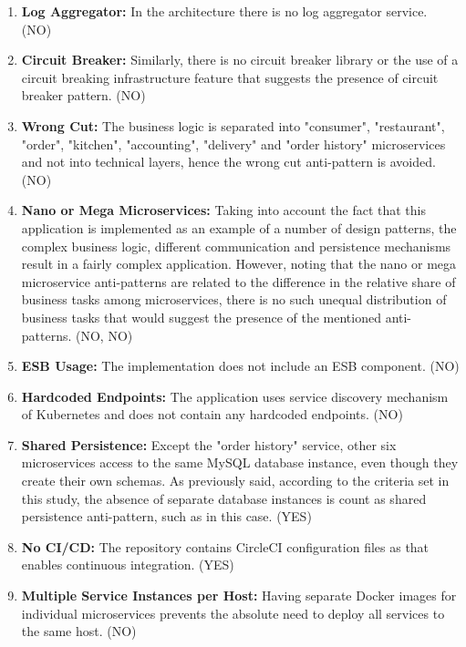 \documentclass{Configuration_Files/PoliMi3i_thesis}
\begin{document}
\begin{enumerate}
    \item \textbf{Log Aggregator:} In the architecture there is no log aggregator service. (NO)
    
    \item \textbf{Circuit Breaker:} Similarly, there is no circuit breaker library or the use of a circuit breaking infrastructure feature that suggests the presence of circuit breaker pattern. (NO)
    
    \item \textbf{Wrong Cut:} The business logic is separated into "consumer", "restaurant", "order", "kitchen", "accounting", "delivery" and "order history" microservices and not into technical layers, hence the wrong cut anti-pattern is avoided. (NO)
    
    \item \textbf{Nano or Mega Microservices:} Taking into account the fact that this application is implemented as an example of a number of design patterns, the complex business logic, different communication and persistence mechanisms result in a fairly complex application.
    However, noting that the nano or mega microservice anti-patterns are related to the difference in the relative share of business tasks among microservices, there is no such unequal distribution of business tasks that would suggest the presence of the mentioned anti-patterns. (NO, NO)
    
    \item \textbf{ESB Usage:} The implementation does not include an ESB component. (NO)
    
    \item \textbf{Hardcoded Endpoints:} The application uses service discovery mechanism of Kubernetes and does not contain any hardcoded endpoints. (NO)
    
    \item \textbf{Shared Persistence:} Except the "order history" service, other six microservices access to the same MySQL database instance, even though they create their own schemas.
    As previously said, according to the criteria set in this study, the absence of separate database instances is count as shared persistence anti-pattern, such as in this case. (YES)
    
    \item \textbf{No CI/CD:} The repository contains CircleCI configuration files as that enables continuous integration. (YES)
    
    \item \textbf{Multiple Service Instances per Host:} Having separate Docker images for individual microservices prevents the absolute need to deploy all services to the same host. (NO)
    

\end{enumerate}
\end{document}
